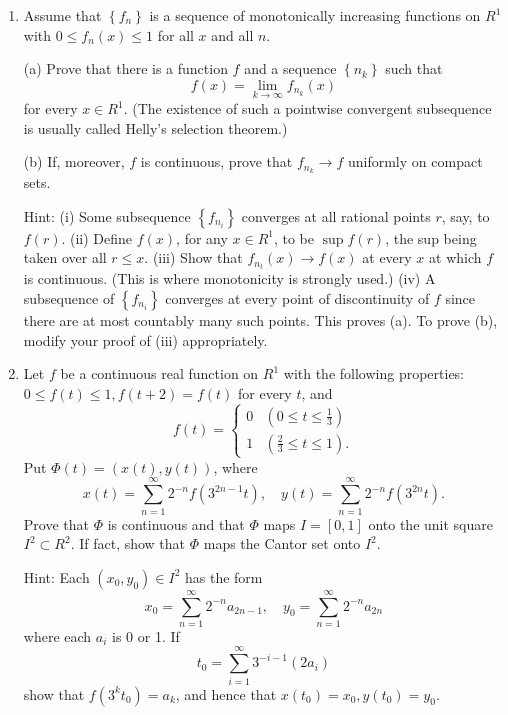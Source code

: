\documentclass[10pt]{article}
\begin{document}
\begin{enumerate}
  This is a rather weak form of Lebesgue's dominated convergence theorem (Theorem 11.32). Even in the context of the Riemann integral, uniform convergence can be replaced by pointwise convergence if it is assumed that $f \in \mathscr{R}$. (See the articles by F. Cunningham in Math. Mag., vol. 40, 1967, pp. 179-186, and by H. Kestelman in Amer. Math. Monthly, vol. 77, 1970, pp. 182-187.)

  \item Assume that $\left\{f_{n}\right\}$ is a sequence of monotonically increasing functions on $R^{1}$ with $0 \leq f_{n}(x) \leq 1$ for all $x$ and all $n$.

  (a) Prove that there is a function $f$ and a sequence $\left\{n_{k}\right\}$ such that
  $$
  f(x)=\lim _{k \rightarrow \infty} f_{n_{k}}(x)
  $$
  for every $x \in R^{1}$. (The existence of such a pointwise convergent subsequence is usually called Helly's selection theorem.)

  (b) If, moreover, $f$ is continuous, prove that $f_{n_{k}} \rightarrow f$ uniformly on compact sets.

  Hint: (i) Some subsequence $\left\{f_{n_{i}}\right\}$ converges at all rational points $r$, say, to $f(r)$. (ii) Define $f(x)$, for any $x \in R^{1}$, to be $\sup f(r)$, the sup being taken over all $r \leq x$. (iii) Show that $f_{n_{t}}(x) \rightarrow f(x)$ at every $x$ at which $f$ is continuous. (This is where monotonicity is strongly used.) (iv) A subsequence of $\left\{f_{n_{i}}\right\}$ converges at every point of discontinuity of $f$ since there are at most countably many such points. This proves (a). To prove (b), modify your proof of (iii) appropriately.

  \item Let $f$ be a continuous real function on $R^{1}$ with the following properties: $0 \leq f(t) \leq 1, f(t+2)=f(t)$ for every $t$, and
  $$
  f(t)= \begin{cases}0 & \left(0 \leq t \leq \frac{1}{3}\right) \\ 1 & \left(\frac{2}{3} \leq t \leq 1\right) .\end{cases}
  $$
  Put $\Phi(t)=(x(t), y(t))$, where
  $$
  x(t)=\sum_{n=1}^{\infty} 2^{-n} f\left(3^{2 n-1} t\right), \quad y(t)=\sum_{n=1}^{\infty} 2^{-n} f\left(3^{2 n} t\right) .
  $$
  Prove that $\Phi$ is continuous and that $\Phi$ maps $I=[0,1]$ onto the unit square $I^{2} \subset R^{2}$. If fact, show that $\Phi$ maps the Cantor set onto $I^{2}$.

  Hint: Each $\left(x_{0}, y_{0}\right) \in I^{2}$ has the form
  $$
  x_{0}=\sum_{n=1}^{\infty} 2^{-n} a_{2 n-1}, \quad y_{0}=\sum_{n=1}^{\infty} 2^{-n} a_{2 n}
  $$
  where each $a_{i}$ is 0 or 1. If
  $$
  t_{0}=\sum_{i=1}^{\infty} 3^{-i-1}\left(2 a_{i}\right)
  $$
  show that $f\left(3^{k} t_{0}\right)=a_{k}$, and hence that $x\left(t_{0}\right)=x_{0}, y\left(t_{0}\right)=y_{0}$.


\end{enumerate}
\end{document}
